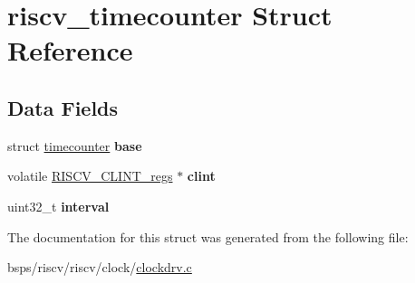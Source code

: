 \hypertarget{structriscv__timecounter}{}\section{riscv\+\_\+timecounter Struct Reference}
\label{structriscv__timecounter}
\subsection*{Data Fields}
\begin{DoxyCompactItemize}
\item 
\mbox{\label{structriscv__timecounter_af86586730e1e70c78ce81082b9797a82}} 
struct \mbox{\hyperlink{structtimecounter}{timecounter}} {\bfseries base}
\item 
\mbox{\label{structriscv__timecounter_a6be3d2ed2cfbc26f1295f9bf6ba3f931}} 
volatile \mbox{\hyperlink{structRISCV__CLINT__regs}{R\+I\+S\+C\+V\+\_\+\+C\+L\+I\+N\+T\+\_\+regs}} $\ast$ {\bfseries clint}
\item 
\mbox{\label{structriscv__timecounter_a39f9b734573e8afffedb1d198c7458d7}} 
uint32\+\_\+t {\bfseries interval}
\end{DoxyCompactItemize}


The documentation for this struct was generated from the following file\+:\begin{DoxyCompactItemize}
\item 
bsps/riscv/riscv/clock/\mbox{\hyperlink{riscv_2riscv_2clock_2clockdrv_8c}{clockdrv.\+c}}\end{DoxyCompactItemize}
